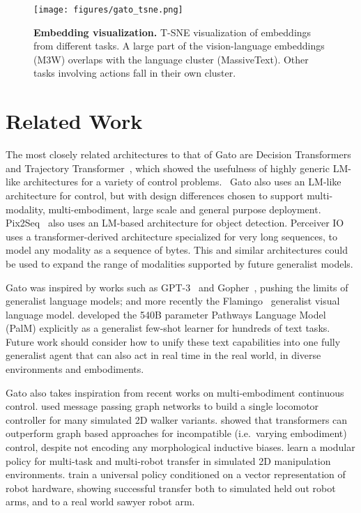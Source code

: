\documentclass[10pt]{article} \usepackage[accepted]{tmlr}
\newcommand{\model}{{Gato}}
\begin{document}
\begin{figure}[t]
    \centering
    \texttt{[image: figures/gato\_tsne.png]} 
    \caption{
    {\bf Embedding visualization.} T-SNE visualization of embeddings from different tasks. A large part of the vision-language embeddings (M3W) overlaps with the language cluster (MassiveText). Other tasks involving actions fall in their own cluster.
    \small}
    \label{fig:tsne}
\end{figure}

\section{Related Work}
\label{sec:related}


The most closely related architectures to that of \model{} are Decision Transformers~\citep{chen2021decision,reid2022can,zheng2022online,furuta2021generalized} and Trajectory Transformer~\citep{janner2021offline}, which showed the usefulness of highly generic LM-like architectures for a variety of control problems.
~\model{} also uses an LM-like architecture for control, but with design differences chosen to support multi-modality, multi-embodiment, large scale and general purpose deployment.
Pix2Seq~\citep{chen2021pix2seq} also uses an LM-based architecture for object detection.
Perceiver IO~\citep{jaegle2021perceiver} uses a transformer-derived architecture specialized for very long sequences, to model any modality as a sequence of bytes.
This and similar architectures could be used to expand the range of modalities supported by future generalist models.


\model{} was inspired by works such as GPT-3~\citep{brown2020language} and Gopher~\citep{rae2021scaling}, pushing the limits of generalist language models; and more recently the  Flamingo~\citep{Alayrac2022FlamingoAV} generalist visual language model.
\citet{chowdhery2022palm} developed the 540B parameter Pathways Language Model (PalM) explicitly as a generalist few-shot learner for hundreds of text tasks.
Future work should consider how to unify these text capabilities into one fully generalist agent that can also act in real time in the real world, in diverse environments and embodiments.



\model{} also takes inspiration from recent works on multi-embodiment continuous control.
\citet{huang2020one} used message passing graph networks to build a single locomotor controller for many simulated 2D walker variants.
\citet{kurin2020my} showed that transformers can outperform graph based approaches for incompatible (i.e.\ varying embodiment) control, despite not encoding any morphological inductive biases.
\citet{devin2017learning} learn a modular policy for multi-task and multi-robot transfer in simulated 2D manipulation environments.
\citet{chen2018hardware} train a universal policy conditioned on a vector representation of robot hardware, showing successful transfer both to simulated held out robot arms, and to a real world sawyer robot arm.
\end{document}
